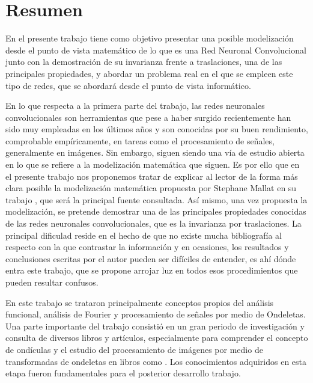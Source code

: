 %


\chapter{Resumen}

\noindent En el presente trabajo tiene como objetivo presentar una posible modelización desde el punto de vista matemático de lo que es una Red Neuronal Convolucional junto con la demostración de su invarianza frente a traslaciones, una de las principales propiedades, y abordar un problema real en el que se empleen este tipo de redes, que se abordará desde el punto de vista informático.

\medskip

\noindent En lo que respecta a la primera parte del trabajo, las redes neuronales convolucionales son herramientas que pese a haber surgido recientemente han sido muy empleadas en los últimos años y son conocidas por su buen rendimiento, comprobable empíricamente, en tareas como el procesamiento de señales, generalmente en imágenes. Sin embargo, siguen siendo una vía de estudio abierta en lo que se refiere a la modelización matemática que siguen. Es por ello que en el presente trabajo nos proponemos tratar de explicar al lector de la forma más clara posible la modelización matemática propuesta por Stephane Mallat en su trabajo \cite{GroupInvariantScattering}, que será la principal fuente consultada. Así mismo, una vez propuesta la modelización, se pretende demostrar una de las principales propiedades conocidas de las redes neuronales convolucionales, que es la invarianza por traslaciones. La principal dificulad reside en el hecho de que no existe mucha bibliografía al respecto con la que contrastar la información y en ocasiones, los resultados y conclusiones escritas por el autor pueden ser difíciles de entender, es ahí dónde entra este trabajo, que se propone arrojar luz en todos esos procedimientos que pueden resultar confusos.

\medskip
\noindent En este trabajo se trataron principalmente conceptos propios del análisis funcional, análisis de Fourier y procesamiento de señales por medio de Ondeletas. Una parte importante del trabajo consistió en un gran periodo de investigación y consulta de diversos libros y artículos, especialmente para comprender el concepto de ondículas \cite{MallatWavelets} y el estudio del procesamiento de imágenes por medio de transformadas de ondeletas en libros como \cite{DigitalImageProcessing}. Los conocimientos adquiridos en esta etapa fueron fundamentales para el posterior desarrollo trabajo.


